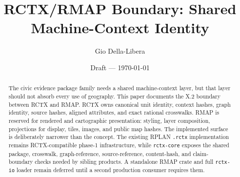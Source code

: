 \documentclass[12pt]{article}
\title{RCTX/RMAP Boundary: Shared Machine-Context Identity}
\author{Gio Della-Libera}
\date{Draft --- \today}
\begin{document}
\maketitle

\begin{abstract}
The civic evidence package family needs a shared machine-context layer, but that
layer should not absorb every use of geography. This paper documents the X.2
boundary between RCTX and RMAP. RCTX owns canonical unit identity, context
hashes, graph identity, source hashes, aligned attributes, and exact rational
crosswalks. RMAP is reserved for rendered and cartographic presentation:
styling, layer composition, projections for display, tiles, images, and public
map hashes. The implemented surface is deliberately narrower than the concept.
The existing RPLAN \texttt{.rctx} implementation remains RCTX-compatible
phase-1 infrastructure, while \texttt{rctx-core} exposes the shared package,
crosswalk, graph-reference, source-reference, content-hash, and claim-boundary
checks needed by sibling products. A standalone RMAP crate and full
\texttt{rctx-io} loader remain deferred until a second production consumer
requires them.
\end{abstract}







\nocite{rcount-overview-2026,rctx-boundary-2026}


\end{document}
